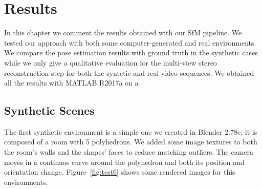 \chapter{Results}
In this chapter we comment the results obtained with our SfM pipeline.
We tested our approach with both some computer-generated and real environments.
We compare the pose estimation results with ground truth in the synthetic cases
while we only give a qualitative evaluation for the multi-view stereo
reconstruction step for both the syntetic and real video sequences.
We obtained all the results with MATLAB R2017a on a 

\section{Synthetic Scenes}
The first synthetic environment is a simple one we created in Blender 2.78c;
it is composed of a room with 5 polyhedrons. We added some image textures to both
the room's walls and the shapes' faces to reduce matching outliers.
The camera moves in a continuos curve around the polyhedron and both its
position and orientation change.
Figure~\ref{fig:test6} shows some rendered images for this environments.
%
